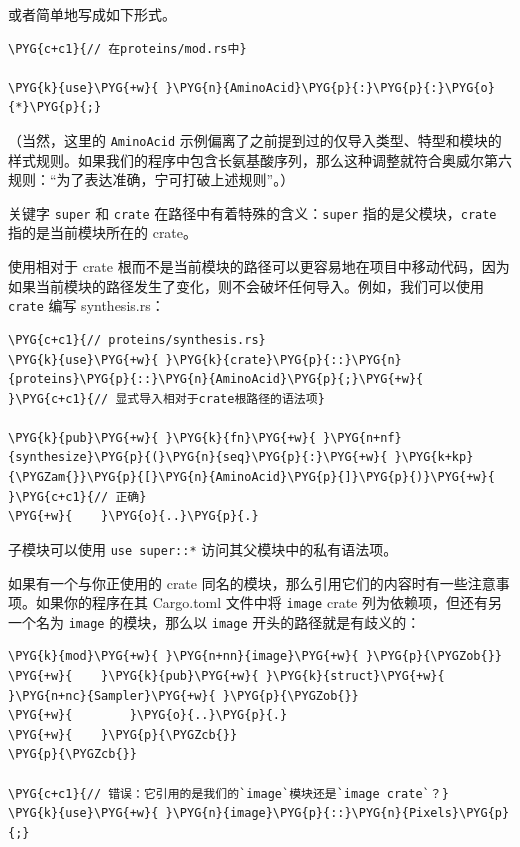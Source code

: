 或者简单地写成如下形式。

\begin{Verbatim}[commandchars=\\\{\},breaklines=true,breakanywhere=true,fontsize=\codefont,xleftmargin=17bp]
\PYG{c+c1}{// 在proteins/mod.rs中}

\PYG{k}{use}\PYG{+w}{ }\PYG{n}{AminoAcid}\PYG{p}{:}\PYG{p}{:}\PYG{o}{*}\PYG{p}{;}
\end{Verbatim}

（当然，这里的 \texttt{AminoAcid} 示例偏离了之前提到过的仅导入类型、特型和模块的样式规则。如果我们的程序中包含长氨基酸序列，那么这种调整就符合奥威尔第六规则：“为了表达准确，宁可打破上述规则”。）

关键字 \texttt{super} 和 \texttt{crate} 在路径中有着特殊的含义：\texttt{super} 指的是父模块，\texttt{crate} 指的是当前模块所在的 crate。

使用相对于 crate 根而不是当前模块的路径可以更容易地在项目中移动代码，因为如果当前模块的路径发生了变化，则不会破坏任何导入。例如，我们可以使用 \texttt{crate} 编写 synthesis.rs：

\begin{Verbatim}[commandchars=\\\{\},breaklines=true,breakanywhere=true,fontsize=\codefont,xleftmargin=17bp]
\PYG{c+c1}{// proteins/synthesis.rs}
\PYG{k}{use}\PYG{+w}{ }\PYG{k}{crate}\PYG{p}{::}\PYG{n}{proteins}\PYG{p}{::}\PYG{n}{AminoAcid}\PYG{p}{;}\PYG{+w}{  }\PYG{c+c1}{// 显式导入相对于crate根路径的语法项}

\PYG{k}{pub}\PYG{+w}{ }\PYG{k}{fn}\PYG{+w}{ }\PYG{n+nf}{synthesize}\PYG{p}{(}\PYG{n}{seq}\PYG{p}{:}\PYG{+w}{ }\PYG{k+kp}{\PYGZam{}}\PYG{p}{[}\PYG{n}{AminoAcid}\PYG{p}{]}\PYG{p}{)}\PYG{+w}{  }\PYG{c+c1}{// 正确}
\PYG{+w}{    }\PYG{o}{..}\PYG{p}{.}
\end{Verbatim}

子模块可以使用 \texttt{use super::*} 访问其父模块中的私有语法项。

如果有一个与你正使用的 crate 同名的模块，那么引用它们的内容时有一些注意事项。如果你的程序在其 Cargo.toml 文件中将 \texttt{image} crate 列为依赖项，但还有另一个名为 \texttt{image} 的模块，那么以 \texttt{image} 开头的路径就是有歧义的：

\begin{Verbatim}[commandchars=\\\{\},breaklines=true,breakanywhere=true,fontsize=\codefont,xleftmargin=17bp]
\PYG{k}{mod}\PYG{+w}{ }\PYG{n+nn}{image}\PYG{+w}{ }\PYG{p}{\PYGZob{}}
\PYG{+w}{    }\PYG{k}{pub}\PYG{+w}{ }\PYG{k}{struct}\PYG{+w}{ }\PYG{n+nc}{Sampler}\PYG{+w}{ }\PYG{p}{\PYGZob{}}
\PYG{+w}{        }\PYG{o}{..}\PYG{p}{.}
\PYG{+w}{    }\PYG{p}{\PYGZcb{}}
\PYG{p}{\PYGZcb{}}

\PYG{c+c1}{// 错误：它引用的是我们的`image`模块还是`image crate`？}
\PYG{k}{use}\PYG{+w}{ }\PYG{n}{image}\PYG{p}{::}\PYG{n}{Pixels}\PYG{p}{;}
\end{Verbatim}

